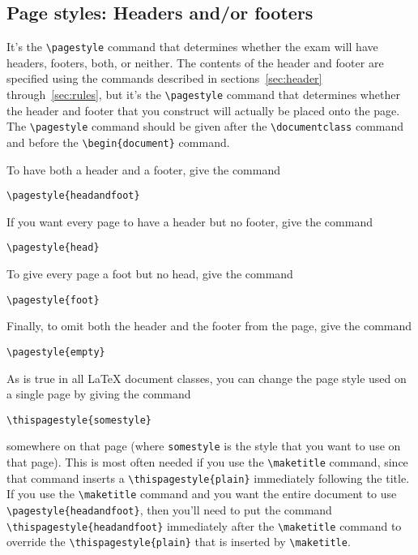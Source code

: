 \documentclass[12pt]{exam}
\begin{document}
\subsection{Page styles: Headers and/or footers}

It's the \verb"\pagestyle" command that determines whether the exam
will have headers, footers, both, or neither.  The contents of the
header and footer are specified using the commands described in
sections~\ref{sec:header} through~\ref{sec:rules}, but it's the
\verb"\pagestyle" command that determines whether the header and
footer that you construct will actually be placed onto the page.  The
\verb"\pagestyle" command should be given after the
\verb"\documentclass" command and before the \verb"\begin{document}"
  command.

To have both a header and a footer, give the command
%
\begin{center}
\verb"\pagestyle{headandfoot}"
\end{center}
%
If you want every page to have a header but no footer, give the
command
%
\begin{center}
\verb"\pagestyle{head}"
\end{center}
%
To give every page a foot but no head, give the command
%
\begin{center}
\verb"\pagestyle{foot}"
\end{center}
%
Finally, to omit both the header and the footer from the page, give
the command
%
\begin{center}
\verb"\pagestyle{empty}"
\end{center}


\bigskip


As is true in all \LaTeX{} document classes, you can change the page
style used on a single page by giving the command
%
\begin{center}
\verb"\thispagestyle{somestyle}"
\end{center}
%
somewhere on that page (where \verb"somestyle" is the style that you
want to use on that page).  This is most often needed if you use the
\verb"\maketitle" command, since that command inserts a
\verb"\thispagestyle{plain}" immediately following the title.  If you
use the \verb"\maketitle" command and you want the entire document to
use \verb"\pagestyle{headandfoot}", then you'll need to put the
command \verb"\thispagestyle{headandfoot}" immediately after the
\verb"\maketitle" command to override the \verb"\thispagestyle{plain}"
that is inserted by \verb"\maketitle".
 
\end{document}
